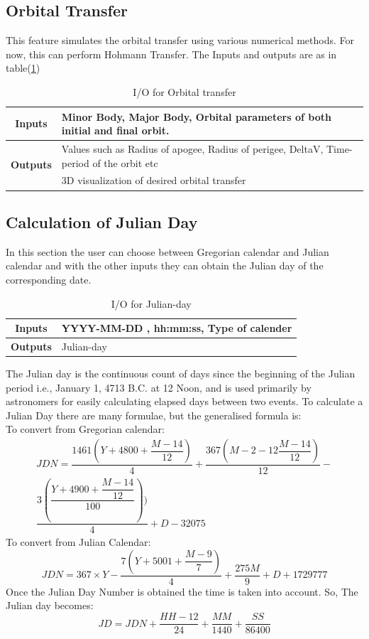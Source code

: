 \subsection{Orbital Transfer}
This feature simulates the orbital transfer using various numerical methods. For now, this can perform Hohmann Transfer. The Inputs and outputs are as in table(\ref{tab:ot})
\begin{table}[H]
\centering
\begin{tabular}{@{}cl@{}}
\toprule
\multicolumn{1}{c}{\textbf{Inputs}} & Minor Body, Major Body, Orbital parameters of both initial and final orbit.                     \\ \midrule
\multirow{2}{*}{\textbf{Outputs}}   & Values such as Radius of apogee, Radius of perigee, DeltaV, Time-period of the orbit etc \\ \cmidrule(l){2-2} 
                           & 3D visualization of desired orbital transfer \\ \bottomrule
\end{tabular}
\caption{I/O for Orbital transfer}
\label{tab:ot}
\end{table}
\subsection{Calculation of Julian Day}
In this section the user can choose between Gregorian calendar and Julian calendar and with the other inputs they can obtain the Julian day of the corresponding date. 
\begin{table}[H]
\centering
\begin{tabular}{@{}cl@{}}
\toprule
\textbf{Inputs}  & YYYY-MM-DD , hh:mm:ss, Type of calender \\ \midrule
\textbf{Outputs} & Julian-day  \\ \bottomrule                                              
\end{tabular}
\caption{I/O for Julian-day}
\label{tab:jd}
\end{table}
The Julian day is the continuous count of days since the beginning of the Julian period i.e., January 1, 4713 B.C. at 12 Noon, and is used primarily by astronomers for easily calculating elapsed days between two events.
To calculate a Julian Day there are many formulae, but the generalised formula is:\\
To convert from Gregorian calendar:
\begin{multline*}
JDN = \dfrac{1461\left(Y+4800+\dfrac{M-14}{12}\right)}{4}+\dfrac{367\left(M-2-12\dfrac{M-14}{12}\right)}{12} - \\
\dfrac{3\left( \dfrac{Y+4900+\dfrac{M-14}{12}}{100}\right))}{4}+D-32075
\end{multline*}
To convert from Julian Calendar:
$$JDN = 367 \times Y - \dfrac{7 \left( Y+5001+\dfrac{M-9}{7}\right)}{4}+\dfrac{275M}{9}+D+1729777$$
Once the Julian Day Number is obtained the time is taken into account. So, The Julian day becomes:
$$JD = JDN+\dfrac{HH-12}{24}+\dfrac{MM}{1440}+\dfrac{SS}{86400}$$
